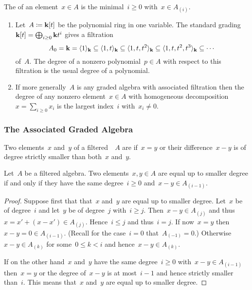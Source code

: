 \begin{definition}
  The  of an element~$x \in A$ is the minimal~$i \geq 0$ with~$x \in A_{(i)}$.
\end{definition}


\begin{example}
  \leavevmode
  \begin{enumerate}
    \item
      Let~$A \coloneqq \mathbf{k}[t]$ be the polynomial ring in one variable.
      The standard grading~$\mathbf{k}[t] = \bigoplus_{i \geq 0} \mathbf{k} t^i$ gives a filtration
      \[
        A_0
        =
        \mathbf{k}
        =
        \langle 1 \rangle_{\mathbf{k}}
        \subseteq
        \langle 1, t \rangle_{\mathbf{k}}
        \subseteq
        \langle 1, t, t^2 \rangle_{\mathbf{k}}
        \subseteq
        \langle 1, t, t^2, t^3 \rangle_{\mathbf{k}}
        \subseteq
        \dotsb
      \]
      of~$A$.
      The degree of a nonzero polynomial~$p \in A$ with respect to this filtration is the usual degree of a polynomial.
    \item
      If more generally~$A$ is any graded algebra with associated filtration then the degree of any nonzero element~$x \in A$ with homogeneous decomposition~$x = \sum_{i \geq 0} x_i$ is the largest index~$i$ with~$x_i \neq 0$.
  \end{enumerate}
\end{example}



\subsubsection{The Associated Graded Algebra}


\begin{definition}
  Two elements~$x$ and~$y$ of a filtered~{\algebra{$\kf$}}~$A$ are  if~$x = y$ or their difference~$x - y$ is of degree strictly smaller than both~$x$ and~$y$.
\end{definition}


\begin{lemma}
  Let~$A$ be a filtered algebra.
  Two elements~$x, y \in A$ are equal up to smaller degree if and only if they have the same degree~$i \geq 0$ and~$x - y \in A_{(i-1)}$.
\end{lemma}


\begin{proof}
  Suppose first that that~$x$ and~$y$ are equal up to smaller degree.
  Let~$x$ be of degree~$i$ and let~$y$ be of degree~$j$ with~$i \geq j$.
  Then~$x - y \in A_{(j)}$ and thus~$x = x' + (x- x') \in A_{(j)}$.
  Hence~$i \leq j$ and thus~$i = j$.  
  If now~$x = y$ then~$x - y = 0 \in A_{(i-1)}$.
  (Recall for the case~$i = 0$ that~$A_{(-1)} = 0$.)
  Otherwise~$x - y \in A_{(k)}$ for some~$0 \leq k < i$ and hence~$x - y \in A_{(k)}$.
  
  If on the other hand~$x$ and~$y$ have the same degree~$i \geq 0$ with~$x - y \in A_{(i-1)}$ then~$x = y$ or the degree of~$x - y$ is at most~$i-1$ and hence strictly smaller than~$i$.
  This means that~$x$ and~$y$ are equal up to smaller degree.
\end{proof}


